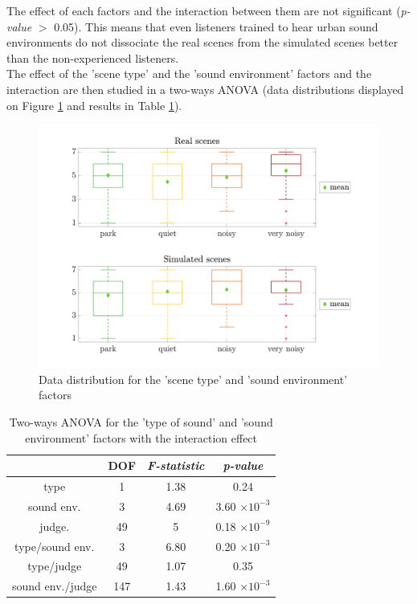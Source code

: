 \documentclass[11pt,letter]{article}
\begin{document}
The effect of each factors and the interaction between them are not significant (\textit{p-value} $>$ 0.05). This means that even listeners trained to hear urban sound environments do not dissociate the real scenes from the simulated scenes better than the non-experienced listeners.\\

The effect of the 'scene type' and the 'sound environment' factors and the interaction are then studied in a two-ways ANOVA (data distributions displayed on Figure \ref{fig:boxplot_type_ambience} and results in Table \ref{tab:p_value_type_ambience}).\\

\begin{figure}[h]
\centering
\includegraphics[width=.7\linewidth]{./pictures/testPerceptif_boxplotAmbianceCOLOR_EN.pdf}
\caption{Data distribution for the 'scene type' and 'sound environment' factors}
\label{fig:boxplot_type_ambience}
\end{figure}

\begin{table}[h]
\centering
\begin{tabular}{cccc}
        & DOF & \textit{F-statistic}    & \textit{p-value} \\ 
\hline
type & 1 & 1.38 & 0.24   \\
\hline
sound env.   & 3 & 4.69 & 3.60 $\times 10^{-3}$  \\ 
\hline
judge.   & 49 & 5 & 0.18 $\times 10^{-9}$  \\ 
\hline
type/sound env. & 3 & 6.80 & 0.20 $\times 10^{-3}$\\
\hline
type/judge & 49 & 1.07 & 0.35\\
\hline
sound env./judge & 147 & 1.43 & 1.60 $\times 10^{-3}$\\
\hline
\end{tabular}
\caption{Two-ways ANOVA for the 'type of sound' and 'sound environment' factors with the interaction effect}
\label{tab:p_value_type_ambience}
\end{table}
\end{document}
